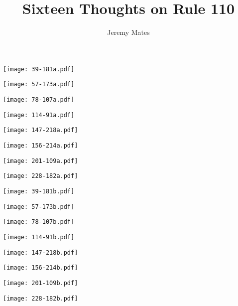 \documentclass[a4paper,10pt,twoside,onecolumn,openany,final]{memoir}
\title{Sixteen Thoughts on Rule 110}
\author{Jeremy Mates}
\begin{document}
\mainmatter

\begin{center}
\bfseries \Huge \thetitle
\end{center}
\begin{flushright}
\theauthor
\end{flushright}

\texttt{[image: 39-181a.pdf]}%

\texttt{[image: 57-173a.pdf]}%

\texttt{[image: 78-107a.pdf]}%

\texttt{[image: 114-91a.pdf]}%

\texttt{[image: 147-218a.pdf]}%

\texttt{[image: 156-214a.pdf]}%

\texttt{[image: 201-109a.pdf]}%

\texttt{[image: 228-182a.pdf]}%

\texttt{[image: 39-181b.pdf]}%

\texttt{[image: 57-173b.pdf]}%

\texttt{[image: 78-107b.pdf]}%

\texttt{[image: 114-91b.pdf]}%

\texttt{[image: 147-218b.pdf]}%

\texttt{[image: 156-214b.pdf]}%

\texttt{[image: 201-109b.pdf]}%

\texttt{[image: 228-182b.pdf]}%

\clearpage
\end{document}
